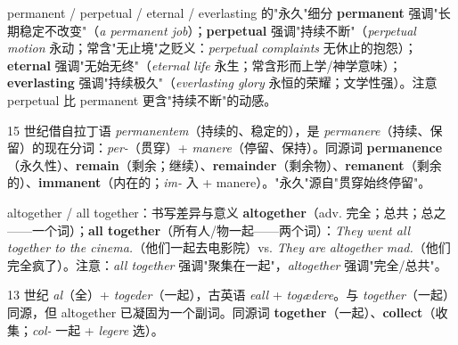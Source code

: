 \documentclass[../main.tex]{subfiles}
\begin{document}


\begin{gram}{permanent / perpetual / eternal / everlasting 的"永久"细分}
\textbf{permanent} 强调"长期稳定不改变"（\textit{a permanent job}）；\textbf{perpetual} 强调"持续不断"（\textit{perpetual motion} 永动；常含"无止境"之贬义：\textit{perpetual complaints} 无休止的抱怨）；\textbf{eternal} 强调"无始无终"（\textit{eternal life} 永生；常含形而上学/神学意味）；\textbf{everlasting} 强调"持续极久"（\textit{everlasting glory} 永恒的荣耀；文学性强）。注意 perpetual 比 permanent 更含"持续不断"的动感。
\end{gram}

\begin{origin}
15 世纪借自拉丁语 \textit{permanentem}（持续的、稳定的），是 \textit{permanere}（持续、保留）的现在分词：\textit{per-}（贯穿）+ \textit{manere}（停留、保持）。同源词 \textbf{permanence}（永久性）、\textbf{remain}（剩余；继续）、\textbf{remainder}（剩余物）、\textbf{remanent}（剩余的）、\textbf{immanent}（内在的；\textit{im-} 入 + manere）。"永久"源自"贯穿始终停留"。
\end{origin}





\begin{lex}{altogether / all together：书写差异与意义}
\textbf{altogether}（adv. 完全；总共；总之——一个词）；\textbf{all together}（所有人/物一起——两个词）：\textit{They went all together to the cinema.}（他们一起去电影院）vs. \textit{They are altogether mad.}（他们完全疯了）。注意：\textit{all together} 强调"聚集在一起"，\textit{altogether} 强调"完全/总共"。
\end{lex}

\begin{origin}
13 世纪 \textit{al}（全）+ \textit{togeder}（一起），古英语 \textit{eall} + \textit{togædere}。与 \textit{together}（一起）同源，但 altogether 已凝固为一个副词。同源词 \textbf{together}（一起）、\textbf{collect}（收集；\textit{col-} 一起 + \textit{legere} 选）。
\end{origin}
\end{document}
